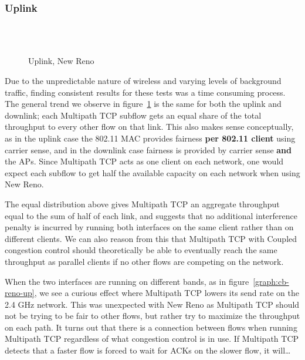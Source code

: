 \subsubsection{Uplink}
\label{sec:results-mptcp-up}

\begin{figure}[h]
  \centering
  \\
  \subfloat[][2.4 GHz, non-overlapping channels] {\
    \scalebox{0.70}{}\label{graph:cc-reno-up}
  }
  \\
  \subfloat[][5 and 2.4 GHz] {\
    \scalebox{0.70}{}\label{graph:cb-reno-up}
  }
  \caption{Uplink, New Reno}\label{graph:reno-up}
\end{figure}

Due to the unpredictable nature of wireless and varying levels of background
traffic, finding consistent results for these tests was a time consuming
process. The general trend we observe in figure~\ref{graph:reno-up} is the
same for both the uplink and downlink; each Multipath TCP subflow gets an equal
share of the total throughput to every other flow on that link. This also makes
sense conceptually, as in the uplink case the 802.11 MAC provides fairness
\textbf{per 802.11 client} using carrier sense, and in the downlink case
fairness is provided by carrier sense \textbf{and} the APs. Since Multipath TCP
acts as one client on each network, one would expect each subflow to get half
the available capacity on each network when using New Reno.

The equal distribution above gives Multipath TCP an aggregate throughput equal
to the sum of half of each link, and suggests that no additional interference
penalty is incurred by running both interfaces on the same client rather than on
different clients. We can also reason from this that Multipath TCP with Coupled
congestion control should theoretically be able to eventually reach the same
throughput as parallel clients if no other flows are competing on the network.

When the two interfaces are running on different bands, as in
figure~\ref{graph:cb-reno-up}, we see a curious effect where Multipath TCP
lowers its send rate on the 2.4 GHz network. This was unexpected with New Reno
as Multipath TCP should not be trying to be fair to other flows, but rather try
to maximize the throughput on each path. It turns out that there is a connection
between flows when running Multipath TCP regardless of what congestion control
is in use. If Multipath TCP detects that a faster flow is forced to wait for
ACKs on the slower flow, it will…

